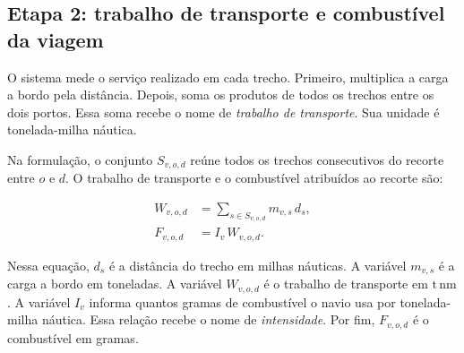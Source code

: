 \subsection*{Etapa 2: trabalho de transporte e combustível da viagem}

O sistema mede o serviço realizado em cada trecho. Primeiro, multiplica a carga a bordo pela distância. Depois, soma os produtos de todos os trechos entre os dois portos. Essa soma recebe o nome de \emph{trabalho de transporte}. Sua unidade é tonelada-milha náutica.

Na formulação, o conjunto \(S_{v,o,d}\) reúne todos os trechos consecutivos do recorte entre \(o\) e \(d\). O trabalho de transporte e o combustível atribuídos ao recorte são:

\begin{equation}
\begin{aligned}
W_{v,o,d} &= \sum_{s\in S_{v,o,d}} m_{v,s}\,d_s, \\
F_{v,o,d} &= I_v\,W_{v,o,d}.
\end{aligned}
\label{eq:trabalho-consumo-viagem}
\end{equation}

Nessa equação, \(d_s\) é a distância do trecho em milhas náuticas. A variável \(m_{v,s}\) é a carga a bordo em toneladas. A variável \(W_{v,o,d}\) é o trabalho de transporte em \(\mathrm{t\,nm}\). A variável \(I_v\) informa quantos gramas de combustível o navio usa por tonelada-milha náutica. Essa relação recebe o nome de \emph{intensidade}. Por fim, \(F_{v,o,d}\) é o combustível em gramas.


